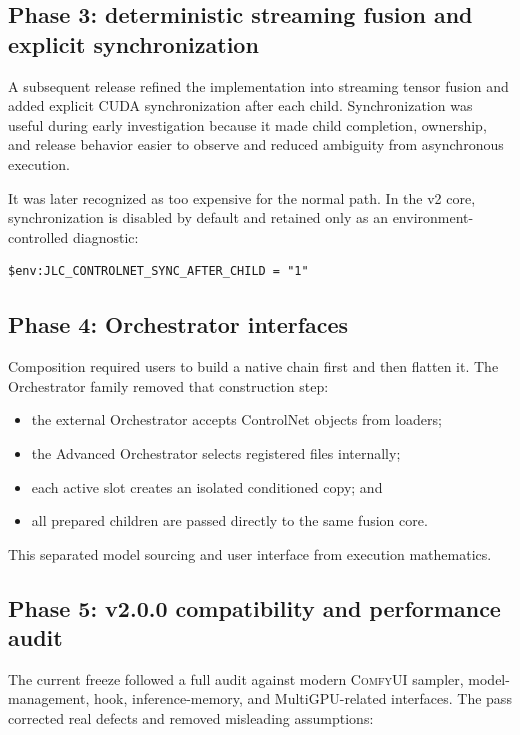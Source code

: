 \documentclass[11pt]{article}
\newcommand{\ComfyUI}{\textsc{ComfyUI}}
\begin{document}
\subsection{Phase 3: deterministic streaming fusion and explicit synchronization}

A subsequent release refined the implementation into streaming tensor fusion and added explicit CUDA synchronization after each child. Synchronization was useful during early investigation because it made child completion, ownership, and release behavior easier to observe and reduced ambiguity from asynchronous execution.

It was later recognized as too expensive for the normal path. In the v2 core, synchronization is disabled by default and retained only as an environment-controlled diagnostic:

\begin{lstlisting}[style=textstyle]
$env:JLC_CONTROLNET_SYNC_AFTER_CHILD = "1"
\end{lstlisting}

\subsection{Phase 4: Orchestrator interfaces}

Composition required users to build a native chain first and then flatten it. The Orchestrator family removed that construction step:

\begin{itemize}
  \item the external Orchestrator accepts ControlNet objects from loaders;
  \item the Advanced Orchestrator selects registered files internally;
  \item each active slot creates an isolated conditioned copy; and
  \item all prepared children are passed directly to the same fusion core.
\end{itemize}

This separated model sourcing and user interface from execution mathematics.

\subsection{Phase 5: v2.0.0 compatibility and performance audit}

The current freeze followed a full audit against modern \ComfyUI{} sampler, model-management, hook, inference-memory, and MultiGPU-related interfaces. The pass corrected real defects and removed misleading assumptions:
\end{document}

